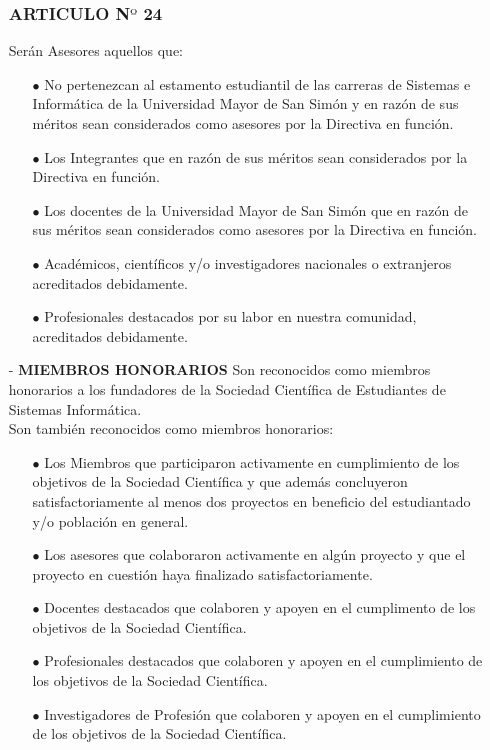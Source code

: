 \documentclass[11pt,letterpaper]{book}
\begin{document}
\begin{itemize}
\subsubsection*{ARTICULO N$º$ 24}
Serán Asesores aquellos que:
\begin{itemize}
\item[$\bullet$] No pertenezcan al estamento estudiantil de las carreras de Sistemas e Informática de la Universidad Mayor de San Simón y en razón de sus méritos sean considerados como asesores por la Directiva en función. 
\item[$\bullet$] Los Integrantes que en razón de sus méritos sean considerados por la Directiva en función.
\item[$\bullet$] Los docentes de la Universidad Mayor de San Simón que en razón de sus méritos sean considerados como asesores por la Directiva en función.
\item[$\bullet$] Académicos, científicos y/o investigadores nacionales o extranjeros acreditados debidamente. 
\item[$\bullet$] Profesionales destacados por su labor en nuestra comunidad, acreditados debidamente. 
\end{itemize}

\item[-] {\bf MIEMBROS HONORARIOS}
Son reconocidos como miembros honorarios a los fundadores de la Sociedad Científica de Estudiantes de Sistemas Informática.\\
Son también reconocidos como miembros honorarios:
\begin{itemize}
\item[$\bullet$] Los Miembros que participaron activamente en cumplimiento de los objetivos de la Sociedad Científica y que además concluyeron satisfactoriamente al menos dos proyectos en beneficio del estudiantado y/o población en general.
\item[$\bullet$] Los asesores que colaboraron activamente en algún proyecto y que el proyecto en	cuestión haya finalizado satisfactoriamente.
\item[$\bullet$] Docentes destacados que colaboren y apoyen en el cumplimento de los objetivos de la Sociedad Científica.
\item[$\bullet$] Profesionales destacados que colaboren y apoyen en el cumplimiento de los objetivos de la Sociedad Científica.
\item[$\bullet$] Investigadores de Profesión que colaboren y apoyen en el cumplimiento de los objetivos de la Sociedad Científica.
\end{itemize}
\end{itemize}
\end{document}
